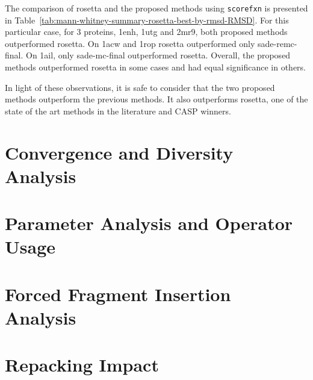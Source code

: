 The comparison of rosetta and the proposed methods using \texttt{scorefxn}
is presented in Table~\ref{tab:mann-whitney-summary-rosetta-best-by-rmsd-RMSD}.
For this particular case, for 3 proteins, 1enh, 1utg and 2mr9, both proposed
methods outperformed rosetta. On 1acw and 1rop rosetta outperformed only
sade-remc-final. On 1ail, only sade-mc-final outperformed rosetta. Overall,
the proposed methods outperformed rosetta in some cases and had equal
significance in others.

In light of these observations, it is safe to consider that the two proposed
methods outperform the previous methods. It also outperforms rosetta, one of
the state of the art methods in the literature and CASP winners.





\section{Convergence and Diversity Analysis}

\section{Parameter Analysis and Operator Usage}

\section{Forced Fragment Insertion Analysis}

\section{Repacking Impact} \label{sec:repacking-impact}

